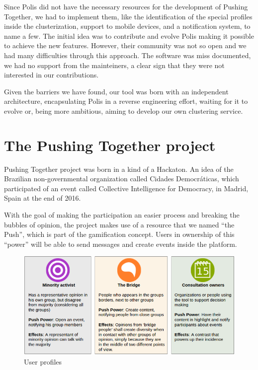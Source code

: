 \documentclass{llncs}
\begin{document}
  Since Polis did not have the necessary resources for the development of
  Pushing Together, we had to implement them, like the identification of
  the special profiles inside the clusterization, support to mobile devices, and a
  notification system, to name a few. The initial idea was to contribute and evolve Polis making it
  possible to achieve the new features. However, their community was not so
  open and we had many difficulties through this approach. The software was miss
  documented, we had no support from the mainteiners, a clear sign that they
  were not interested in our contributions.

  Given the barriers we have found, our tool was born with an independent
  architecture, encapsulating Polis in a reverse engineering effort, waiting
  for it to evolve or, being more ambitious, aiming to develop our own clustering
  service.

\section{The Pushing Together project}
\label{sec:pushingtogether}

  Pushing Together project was born in a kind of a Hackaton. An idea of the 
  Brazilian non-governmental organization called Cidades Democráticas, which participated of an event
  called Collective Intelligence for Democracy, in Madrid, Spain at the end of
  2016.

  With the goal of making the participation an easier process and breaking the
  bubbles of opinion, the project makes use of a resource that we named ``the Push'',
  which is part of the gamification concept. Users in ownership of this ``power''
  will be able to send messages and create events inside the platform.

 \begin{figure}[hbt]
   \centering
     \includegraphics[keepaspectratio=true,scale=0.45]{images/userprofiles.png}
   \caption{User profiles}
   \label{fig:userprofiles}
 \end{figure}
\end{document}
